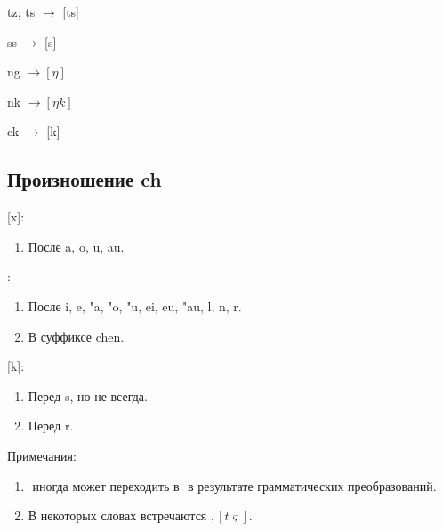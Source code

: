\documentclass[oneside]{book}
\begin{document}
	tz, ts
	\begin{math}
		\longrightarrow
	\end{math}
	[ts]

	ss
	\begin{math}
		\longrightarrow
	\end{math}
	[s]

	ng
	\begin{math}
		\longrightarrow [\eta]
	\end{math}

	nk
	\begin{math}
		\longrightarrow [\eta k]
	\end{math}

	ck
	\begin{math}
		\longrightarrow
	\end{math}
	[k]

	\subsection{Произношение ch}
	[x]:
	\begin{enumerate}
		\item После a, o, u, au.
	\end{enumerate}

	\begin{math}
		[\zeta]
	\end{math}:
	\begin{enumerate}
		\item После i, e, "a, "o, "u, ei, eu, "au, l, n, r.
		\item В суффиксе chen.
	\end{enumerate}

	[k]:
	\begin{enumerate}
		\item Перед s, но не всегда.
		\item Перед r.
	\end{enumerate}

	Примечания:
	\begin{enumerate}
		\item
		\begin{math}
			[x]
		\end{math}
		иногда может переходить в
		\begin{math}
			[\zeta]
		\end{math}
		в результате грамматических преобразований.

		\item В некоторых словах встречаются
		\begin{math}
			[\varsigma], [t\varsigma]
		\end{math}.
	\end{enumerate}
\end{document}
